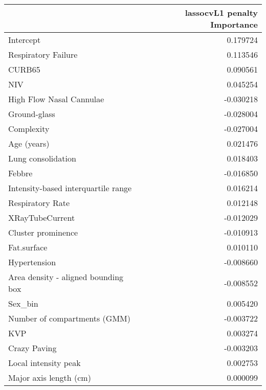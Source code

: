 {\begin{tabular}{lr}
\toprule
{} &  lassocvL1 penalty Importance \\
\midrule
Intercept                           &                      0.179724 \\
Respiratory Failure                 &                      0.113546 \\
CURB65                              &                      0.090561 \\
NIV                                 &                      0.045254 \\
High Flow Nasal Cannulae            &                     -0.030218 \\
Ground-glass                        &                     -0.028004 \\
Complexity                          &                     -0.027004 \\
Age (years)                         &                      0.021476 \\
Lung consolidation                  &                      0.018403 \\
Febbre                              &                     -0.016850 \\
Intensity-based interquartile range &                      0.016214 \\
Respiratory Rate                    &                      0.012148 \\
XRayTubeCurrent                     &                     -0.012029 \\
Cluster prominence                  &                     -0.010913 \\
Fat.surface                         &                      0.010110 \\
Hypertension                        &                     -0.008660 \\
Area density - aligned bounding box &                     -0.008552 \\
Sex\_bin                             &                      0.005420 \\
Number of compartments (GMM)        &                     -0.003722 \\
KVP                                 &                      0.003274 \\
Crazy Paving                        &                     -0.003203 \\
Local intensity peak                &                      0.002753 \\
Major axis length (cm)              &                      0.000099 \\

\end{tabular}}
